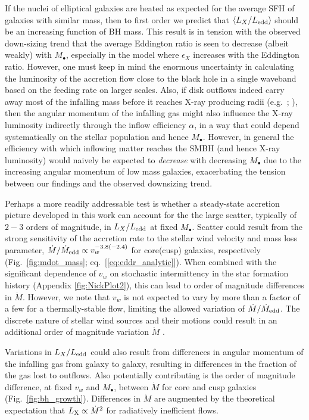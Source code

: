 \documentclass[usenatbib,fleqn]{mn2e}
\begin{document}
If the nuclei of elliptical galaxies are heated as expected for the
average SFH of galaxies with similar mass, then to first order we
predict that $\langle L_{X}/L_{\rm edd}\rangle$ should be an
increasing function of BH mass.  This result is in tension with the
observed down-sizing trend that the average Eddington ratio is seen to
decrease (albeit weakly) with $M_{\bullet}$, especially in the model
where $\epsilon_X$ increases with the Eddington ratio.  However, one
must keep in mind the enormous uncertainty in calculating the
luminosity of the accretion flow close to the black hole in a single
waveband based on the feeding rate on larger scales.  Also, if disk
outflows indeed carry away most of the infalling mass before it
reaches X-ray producing radii (e.g.~\citealt{Blandford&Begelman99};
\citealt{Li+13}), then the angular momentum of the infalling gas might
also influence the X-ray luminosity indirectly through the inflow
efficiency $\alpha$, in a way that could depend systematically on the
stellar population and hence $M_{\bullet}$.  However, in general the
efficiency with which inflowing matter reaches the SMBH (and hence
X-ray luminosity) would naively be expected to {\it decrease} with
decreasing $M_{\bullet}$ due to the increasing angular momentum of low
mass galaxies, exacerbating the tension between our findings and the
observed downsizing trend.

Perhaps a more readily addressable test is whether a steady-state
accretion picture developed in this work can account for the the large
scatter, typically of $2-3$ orders of magnitude, in $L_{X}/L_{\rm
  edd}$ at fixed $M_{\bullet}$.  Scatter could result from the strong
sensitivity of the accretion rate to the stellar wind velocity and
mass loss parameter, $\dot{M}/\dot{M}_{\rm edd} \propto
v_{w}^{-3.8(-2.4)}$ for core(cusp) galaxies, respectively
(Fig.~\ref{fig:mdot_mass}; eq.~[\ref{eq:eddr_analytic}]).  When
combined with the significant dependence of $v_w$ on stochastic
intermittency in the star formation history (Appendix
\ref{fig:NickPlot2}), this can lead to order of magnitude differences
in $\dot{M}$. However, we note that $v_w$ is not expected to vary by
more than a factor of a few for a thermally-stable flow, limiting the
allowed variation of $\dot{M}/\dot{M}_{\rm edd}$. The discrete nature
of stellar wind sources and their motions could result in an
additional order of magnitude variation $\dot{M}$ \citep{Cuadra+2008}. 

Variations in $L_{X}/L_{\rm edd}$ could also result from differences
in angular momentum of the infalling gas from galaxy to galaxy,
resulting in differences in the fraction of the gas lost to outflows.
Also potentially contributing is the order of magnitude difference, at
fixed $v_w$ and $M_{\bullet}$, between $\dot{M}$ for core and cusp
galaxies (Fig.~\ref{fig:bh_growth}).  Differences in $\dot{M}$ are
augmented by the theoretical expectation that $L_{\rm X} \propto
\dot{M}^{2} $ for radiatively inefficient flows.
\end{document}
